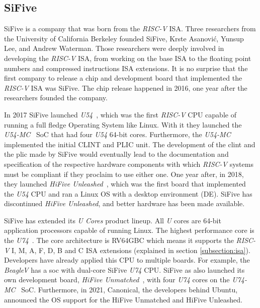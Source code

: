 \subsection{SiFive}
SiFive is a company that was born from the \textit{RISC-V} ISA. Three researchers from the University of California Berkeley founded SiFive, Krste Asanović, Yunsup Lee, and Andrew Waterman. Those researchers were deeply involved in developing the \textit{RISC-V} ISA, from working on the base ISA to the floating point numbers and compressed instructions ISA extensions. It is no surprise that the first company to release a chip and development board that implemented the \textit{RISC-V} ISA was SiFive. The chip release happened in 2016, one year after the researchers founded the company.

In 2017 SiFive launched \textit{U54}~\cite{u54}, which was the first \textit{RISC-V} CPU capable of running a full fledge Operating System like Linux. With it they launched the \textit{U54-MC}~\cite{u54-mc} SoC that had four \textit{U54} 64-bit cores. Furthermore, the \textit{U54-MC} implemented the initial CLINT and PLIC unit. The development of the \acrshort{clint} and the \acrshort{plic} made by SiFive would eventually lead to the documentation and specification of the respective hardware components with which \textit{RISC-V} systems must be compliant if they proclaim to use either one. One year after, in 2018, they launched \textit{HiFive Unleashed}~\cite{hifive_unleashed}, which was the first board that implemented the \textit{U54} CPU and ran a Linux OS with a desktop environment (DE). SiFive has discontinued \textit{HiFive Unleashed}, and better hardware has been made available.

SiFive has extended its \textit{U Cores} product lineup. All \textit{U} cores are 64-bit application processors capable of running Linux. The highest performance core is the \textit{U74}~\cite{u74}. The core architecture is RV64GBC which means it supports the \textit{RISC-V} I, M, A, F, D, B and C ISA extensions (explained in section \ref{subsection:isa}). Developers have already applied this CPU to multiple boards. For example, the \textit{BeagleV} has a \acrshort{soc} with dual-core SiFive \textit{U74} CPU. SiFive as also launched its own development board, \textit{HiFive Unmatched}~\cite{hifive_unmatched}, with four \textit{U74} cores on the \textit{U74-MC}~\cite{u74-mc} SoC. Furthermore, in 2021, Canonical, the developers behind Ubuntu, announced the OS support for the HiFive Unmatched and HiFive Unleashed.

